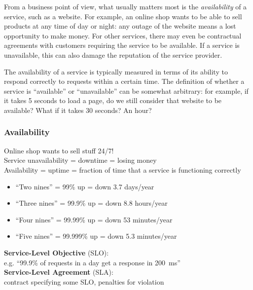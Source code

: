 From a business point of view, what usually matters most is the \emph{availability} of a service, such as a website.
For example, an online shop wants to be able to sell products at any time of day or night: any outage of the website means a lost opportunity to make money.
For other services, there may even be contractual agreements with customers requiring the service to be available.
If a service is unavailable, this can also damage the reputation of the service provider.

The availability of a service is typically measured in terms of its ability to respond correctly to requests within a certain time.
The definition of whether a service is ``available'' or ``unavailable'' can be somewhat arbitrary: for example, if it takes 5 seconds to load a page, do we still consider that website to be available?
What if it takes 30 seconds?
An hour?

\begin{frame}
    \label{s:availability}
    \frametitle{Availability}
    Online shop wants to sell stuff 24/7! \\
    Service unavailability = downtime = losing money \\[1em]
    Availability = uptime = fraction of time that a service is functioning correctly
    \begin{itemize}
        \item ``Two nines'' = 99\% up = down 3.7 days/year
        \item ``Three nines'' = 99.9\% up = down 8.8 hours/year
        \item ``Four nines'' = 99.99\% up = down 53 minutes/year
        \item ``Five nines'' = 99.999\% up = down 5.3 minutes/year\\[1.5em]
    \end{itemize}\pause
    \textbf{Service-Level Objective} (SLO):\\ e.g. ``99.9\% of requests in a day get a response in 200~ms''\\[1em]
    \textbf{Service-Level Agreement} (SLA):\\ contract specifying some SLO, penalties for violation
\end{frame}
\label{l:availability}

